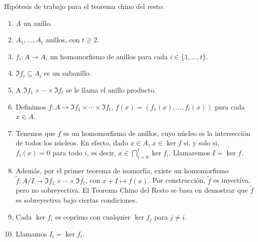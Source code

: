   Hipótesis de trabajo para el teorema chino del resto:
  \begin{enumerate}
    \item \(A\) un anillo.
    \item \(A_1,\ldots,A_t\) anillos, con \(t \ge 2\).
    \item \(f_i:A\longrightarrow A_i\) un homomorfismo de anillos
      para cada \(i\in\{1,\ldots,t\}\).
    \item \(\Im f_i\subseteq A_i\) es un subanillo.
    \item A \(\Im f_1\times\cdots\times\Im f_t\) se le llama el anillo
      producto.
    \item Definimos \(f:A\longrightarrow\Im f_1\times\cdots\times\Im f_t\),
      \(f(x)=(f_1(x),\ldots,f_t(x))\) para cada \(x\in A\).
    \item Tenemos que \(f\) es un homomorfismo de anillos, cuyo núcleo es la
      intersección de todos los núcleos.
      En efecto, dado \(x\in A\), \(x\in\ker f\) si, y solo si, \(f_i(x)=0\) para todo \(i\),
      es decir, \(x\in\bigcap_{i=0}^t \ker f_i\). Llamaremos \(I=\ker f\).
    \item  Además, por el primer teorema de isomorfía, existe un homomorfismo
    \(\tilde{f}:A/I \longrightarrow\Im f_1\times\cdots\times\Im f_t\),
      con \(x+I\mapsto f(x)\). Por construcción, \(\tilde{f}\) es inyectiva, 
      pero no sobreyectiva. El Teorema Chino del Resto se basa en demostrar
      que \(\tilde{f}\) es sobreyectiva bajo ciertas condiciones.
    \item Cada \(\ker f_i\) es coprimo con cualquier \(\ker f_j\)
      para \(j\neq i\).
    \item Llamamos \(I_i=\ker f_i\).
  \end{enumerate}

